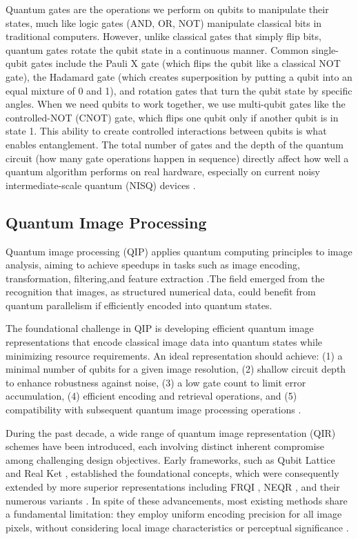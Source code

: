 \documentclass[pdflatex,sn-mathphys-num,Numbered]{sn-jnl}
\theoremstyle{thmstyleone}
\theoremstyle{thmstyletwo}
\theoremstyle{thmstylethree}
\begin{document}
Quantum gates are the operations we perform on qubits to manipulate their states, much like logic gates (AND, OR, NOT) manipulate classical bits in traditional computers. However, unlike classical gates that simply flip bits, quantum gates rotate the qubit state in a continuous manner. Common single-qubit gates include the Pauli X gate (which flips the qubit like a classical NOT gate), the Hadamard gate (which creates superposition by putting a qubit into an equal mixture of 0 and 1), and rotation gates that turn the qubit state by specific angles. When we need qubits to work together, we use multi-qubit gates like the controlled-NOT (CNOT) gate, which flips one qubit only if another qubit is in state 1. This ability to create controlled interactions between qubits is what enables entanglement. The total number of gates and the depth of the quantum circuit (how many gate operations happen in sequence) directly affect how well a quantum algorithm performs on real hardware, especially on current noisy intermediate-scale quantum (NISQ) devices \cite{bib9,bib10,bib11}.

\subsection{Quantum Image Processing}

Quantum image processing (QIP) applies quantum computing principles to image analysis, aiming to achieve speedups in tasks such as image encoding, transformation, filtering,and feature extraction \cite{bib12,bib13}.The field emerged from the recognition that images, as structured numerical data, could benefit from quantum parallelism if efficiently encoded into quantum states.

The foundational challenge in QIP is developing efficient quantum image representations that encode classical image data into quantum states while minimizing resource requirements. An ideal representation should achieve: (1) a minimal number of qubits for a given image resolution, (2) shallow circuit depth to enhance robustness against noise, (3) a low gate count to limit error accumulation, (4) efficient encoding and retrieval operations, and (5) compatibility with subsequent quantum image processing operations \cite{bib14,bib15}.

During the past decade, a wide range of quantum image representation (QIR) schemes have been introduced, each involving distinct inherent compromise among challenging design objectives. Early frameworks, such as Qubit Lattice \cite{bib16} and Real Ket \cite{bib17}, established the foundational concepts, which were consequently extended by more superior representations including FRQI \cite{bib18}, NEQR \cite{bib19}, and their numerous variants \cite{bib20,bib21,bib22,bib23}. In spite of these advancements, most existing methods share a fundamental limitation: they employ uniform encoding precision for all image pixels, without considering local image characteristics or perceptual significance \cite{bib24,bib25}.
\end{document}
